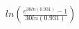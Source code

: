 \documentclass[preview]{standalone}
\begin{document}
\begin{align*}
ln(\frac{e^{30ln(0.931)}-1}{30ln(0.931)})
\end{align*}
\end{document}
